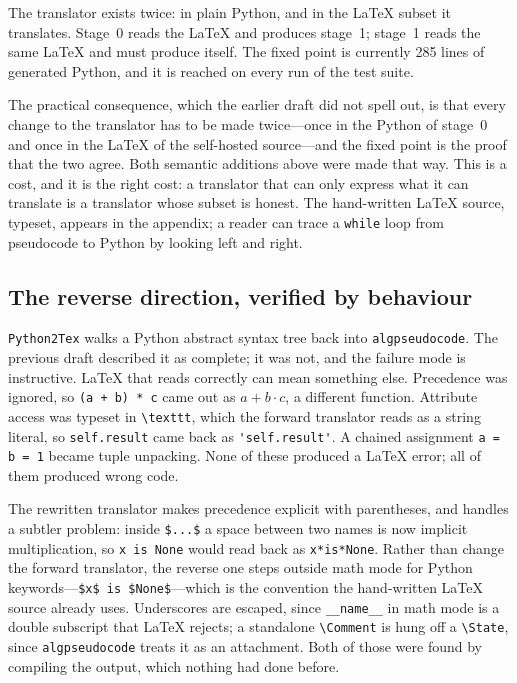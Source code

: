 \documentclass[11pt]{article}
\begin{document}
The translator exists twice: in plain Python, and in the \LaTeX{} subset it
translates. Stage~0 reads the \LaTeX{} and produces stage~1; stage~1 reads the
same \LaTeX{} and must produce itself. The fixed point is currently 285 lines of
generated Python, and it is reached on every run of the test suite.

The practical consequence, which the earlier draft did not spell out, is that
every change to the translator has to be made twice---once in the Python of
stage~0 and once in the \LaTeX{} of the self-hosted source---and the fixed point
is the proof that the two agree. Both semantic additions above were made that
way. This is a cost, and it is the right cost: a translator that can only
express what it can translate is a translator whose subset is honest. The
hand-written \LaTeX{} source, typeset, appears in the appendix; a reader can
trace a \verb|while| loop from pseudocode to Python by looking left and right.

\subsection{The reverse direction, verified by behaviour}

\texttt{Python2Tex} walks a Python abstract syntax tree back into
\texttt{algpseudocode}. The previous draft described it as complete; it was
not, and the failure mode is instructive. \LaTeX{} that reads correctly can
mean something else. Precedence was ignored, so \verb|(a + b) * c| came out as
$a + b \cdot c$, a different function. Attribute access was typeset in
\verb|\texttt|, which the forward translator reads as a string literal, so
\verb|self.result| came back as \verb|'self.result'|. A chained assignment
\verb|a = b = 1| became tuple unpacking. None of these produced a \LaTeX{}
error; all of them produced wrong code.

The rewritten translator makes precedence explicit with parentheses, and
handles a subtler problem: inside \verb|$...$| a space between two names is now
implicit multiplication, so \verb|x is None| would read back as
\verb|x*is*None|. Rather than change the forward translator, the reverse one
steps outside math mode for Python keywords---\verb|$x$ is $None$|---which is
the convention the hand-written \LaTeX{} source already uses. Underscores are
escaped, since \verb|__name__| in math mode is a double subscript that \LaTeX{}
rejects; a standalone \verb|\Comment| is hung off a \verb|\State|, since
\texttt{algpseudocode} treats it as an attachment. Both of those were found by
compiling the output, which nothing had done before.
\end{document}
